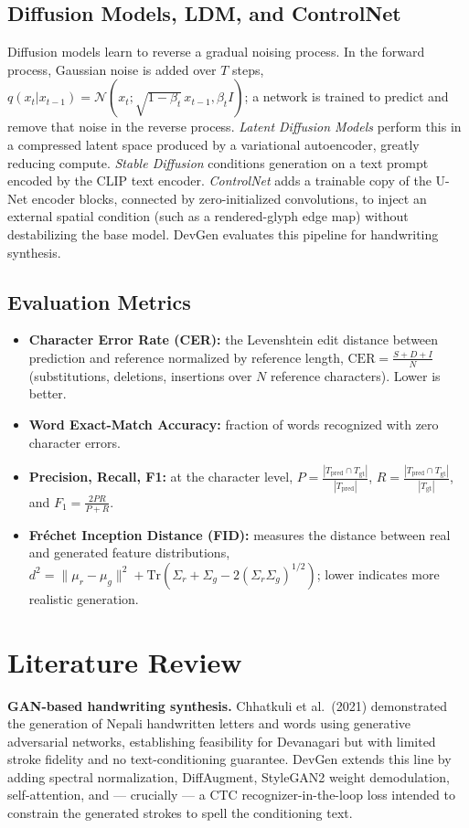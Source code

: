 \documentclass[12pt,a4paper]{report}
\begin{document}
\subsection{Diffusion Models, LDM, and ControlNet}
Diffusion models learn to reverse a gradual noising process. In the forward process, Gaussian noise is added over $T$ steps, $q(x_t|x_{t-1}) = \mathcal{N}(x_t; \sqrt{1-\beta_t}\,x_{t-1}, \beta_t I)$; a network is trained to predict and remove that noise in the reverse process. \textit{Latent Diffusion Models} perform this in a compressed latent space produced by a variational autoencoder, greatly reducing compute. \textit{Stable Diffusion} conditions generation on a text prompt encoded by the CLIP text encoder. \textit{ControlNet} adds a trainable copy of the U-Net encoder blocks, connected by zero-initialized convolutions, to inject an external spatial condition (such as a rendered-glyph edge map) without destabilizing the base model. DevGen evaluates this pipeline for handwriting synthesis.

\subsection{Evaluation Metrics}
\begin{itemize}[itemsep=2pt]
  \item \textbf{Character Error Rate (CER):} the Levenshtein edit distance between prediction and reference normalized by reference length, $\mathrm{CER} = \frac{S + D + I}{N}$ (substitutions, deletions, insertions over $N$ reference characters). Lower is better.
  \item \textbf{Word Exact-Match Accuracy:} fraction of words recognized with zero character errors.
  \item \textbf{Precision, Recall, F1:} at the character level, $P = \frac{|T_{\mathrm{pred}} \cap T_{\mathrm{gt}}|}{|T_{\mathrm{pred}}|}$, $R = \frac{|T_{\mathrm{pred}} \cap T_{\mathrm{gt}}|}{|T_{\mathrm{gt}}|}$, and $F_1 = \frac{2PR}{P+R}$.
  \item \textbf{Fr\'echet Inception Distance (FID):} measures the distance between real and generated feature distributions, $d^2 = \lVert \mu_r - \mu_g \rVert^2 + \mathrm{Tr}(\Sigma_r + \Sigma_g - 2(\Sigma_r\Sigma_g)^{1/2})$; lower indicates more realistic generation.
\end{itemize}

\section{Literature Review}
\textbf{GAN-based handwriting synthesis.} Chhatkuli et al.\ (2021) demonstrated the generation of Nepali handwritten letters and words using generative adversarial networks, establishing feasibility for Devanagari but with limited stroke fidelity and no text-conditioning guarantee. DevGen extends this line by adding spectral normalization, DiffAugment, StyleGAN2 weight demodulation, self-attention, and --- crucially --- a CTC recognizer-in-the-loop loss intended to constrain the generated strokes to spell the conditioning text.
\end{document}
